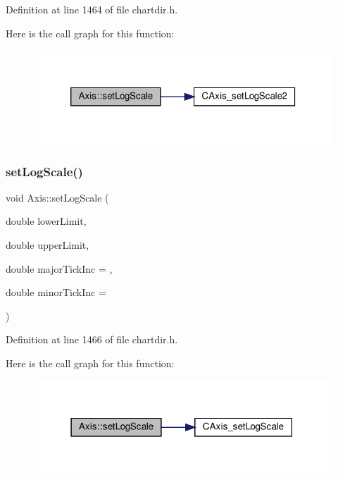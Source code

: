 Definition at line 1464 of file chartdir.\+h.

Here is the call graph for this function\+:
\nopagebreak
\begin{figure}[H]
\begin{center}
\leavevmode
\includegraphics[width=320pt]{class_axis_a38921521a2868738d43f444f6061400c_cgraph}
\end{center}
\end{figure}
\mbox{\label{class_axis_a9f627fa0efdecec10a6cf63189553921}} 
\subsubsection{\texorpdfstring{set\+Log\+Scale()}{setLogScale()}\hspace{0.1cm}{\footnotesize\ttfamily [4/4]}}
{\footnotesize\ttfamily void Axis\+::set\+Log\+Scale (\begin{DoxyParamCaption}\item[{double}]{lower\+Limit,  }\item[{double}]{upper\+Limit,  }\item[{double}]{major\+Tick\+Inc = {},  }\item[{double}]{minor\+Tick\+Inc = {} }\end{DoxyParamCaption})\hspace{0.3cm}{\ttfamily [inline]}}



Definition at line 1466 of file chartdir.\+h.

Here is the call graph for this function\+:
\nopagebreak
\begin{figure}[H]
\begin{center}
\leavevmode
\includegraphics[width=315pt]{class_axis_a9f627fa0efdecec10a6cf63189553921_cgraph}
\end{center}
\end{figure}
\mbox{\label{class_axis_a03b7110aeda343e1c17567741dc47a1d}} 
